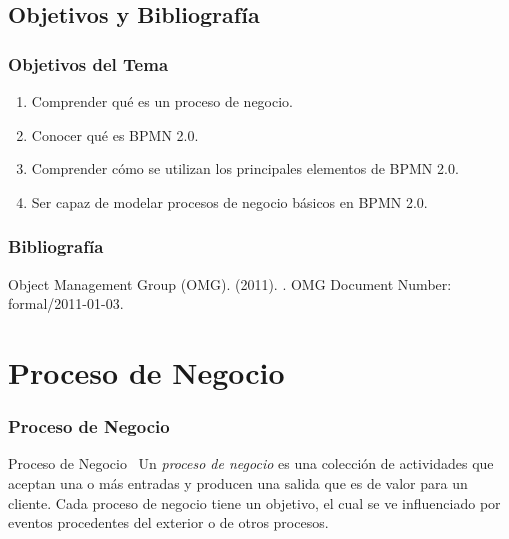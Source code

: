 \documentclass[a4paper,slidestop,xcolor=pst,blue]{beamer}
\begin{document}
\subsection{Objetivos y Bibliografía}

\begin{frame}[c]
    \frametitle{Objetivos del Tema}
    \begin{enumerate}[<+->]
         \item Comprender qué es un proceso de negocio.
         \item Conocer qué es BPMN 2.0.
         \item Comprender cómo se utilizan los principales elementos de BPMN 2.0.
         \item Ser capaz de modelar procesos de negocio básicos en BPMN 2.0.
    \end{enumerate}
\end{frame}

\begin{frame}[c]
    \frametitle{Bibliografía}
    \begin{thebibliography}{1}
        Object Management Group (OMG). (2011).
        .
        \newblock OMG Document Number: formal/2011-01-03.
    \end{thebibliography}
\end{frame}

\section{Proceso de Negocio}

\begin{frame}[c]
    \frametitle{Proceso de Negocio}
    \begin{block}{Proceso de Negocio~\cite{}}
        Un \emph{proceso de negocio} es una colección de actividades que aceptan una o más entradas y producen una salida que es de valor para un cliente. Cada proceso de negocio tiene un objetivo, el cual se ve influenciado por eventos procedentes del exterior o de otros procesos.
    \end{block}
\end{frame}
\end{document}
